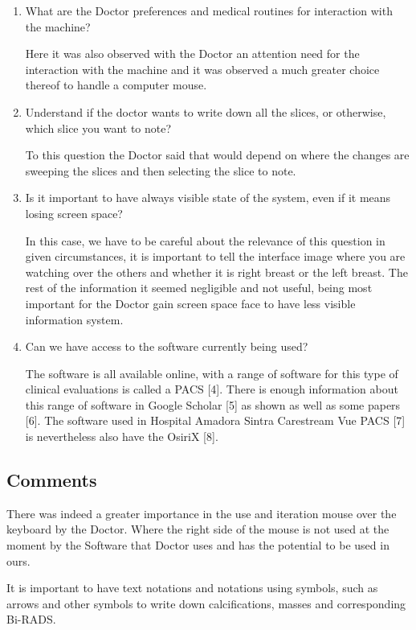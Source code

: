 \begin{enumerate}
  \item What are the Doctor preferences and medical routines for interaction with the machine?
  
  Here it was also observed with the Doctor an attention need for the interaction with the machine and it was observed a much greater choice thereof to handle a computer mouse.
  
  \item Understand if the doctor wants to write down all the slices, or otherwise, which slice you want to note?
  
  To this question the Doctor said that would depend on where the changes are sweeping the slices and then selecting the slice to note.
  
  \item Is it important to have always visible state of the system, even if it means losing screen space?
  
   In this case, we have to be careful about the relevance of this question in given circumstances, it is important to tell the interface image where you are watching over the others and whether it is right breast or the left breast. The rest of the information it seemed negligible and not useful, being most important for the Doctor gain screen space face to have less visible information system.
  
  \item Can we have access to the software currently being used?
  
  The software is all available online, with a range of software for this type of clinical evaluations is called a PACS [4]. There is enough information about this range of software in Google Scholar [5] as shown as well as some papers [6]. The software used in Hospital Amadora Sintra Carestream Vue PACS [7] is nevertheless also have the OsiriX [8].

\end{enumerate}

\subsection{Comments}

There was indeed a greater importance in the use and iteration mouse over the keyboard by the Doctor. Where the right side of the mouse is not used at the moment by the Software that Doctor uses and has the potential to be used in ours.

It is important to have text notations and notations using symbols, such as arrows and other symbols to write down calcifications, masses and corresponding Bi-RADS.

